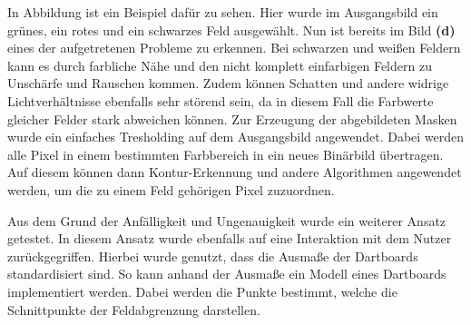 In Abbildung  ist ein Beispiel dafür zu sehen. Hier wurde im Ausgangsbild ein grünes, ein rotes und ein schwarzes Feld ausgewählt. Nun ist bereits im Bild \textbf{(d)} eines der aufgetretenen Probleme zu erkennen. Bei schwarzen und weißen Feldern kann es durch farbliche Nähe und den nicht komplett einfarbigen Feldern zu Unschärfe und Rauschen kommen. Zudem können Schatten und andere widrige Lichtverhältnisse ebenfalls sehr störend sein, da in diesem Fall die Farbwerte gleicher Felder stark abweichen können. 
Zur Erzeugung der abgebildeten Masken wurde ein einfaches Tresholding auf dem Ausgangsbild angewendet. Dabei werden alle Pixel in einem bestimmten Farbbereich in ein neues Binärbild übertragen. Auf diesem können dann Kontur-Erkennung und andere Algorithmen angewendet werden, um die zu einem Feld gehörigen Pixel zuzuordnen.


Aus dem Grund der Anfälligkeit und Ungenauigkeit wurde ein weiterer Ansatz getestet.
In diesem Ansatz wurde ebenfalls auf eine Interaktion mit dem Nutzer zurückgegriffen.
Hierbei wurde genutzt, dass die Ausmaße der Dartboards standardisiert sind. So kann anhand der Ausmaße ein Modell eines Dartboards implementiert werden. Dabei werden die Punkte bestimmt, welche die Schnittpunkte der Feldabgrenzung darstellen. 

